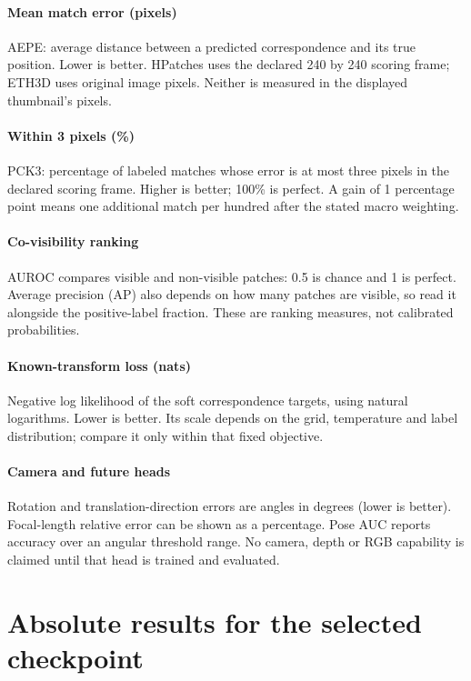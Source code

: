 \documentclass[10pt]{article}
\begin{document}
\paragraph{Mean match error (pixels)} AEPE: average distance between a predicted correspondence and its true position. Lower is better. HPatches uses the declared 240 by 240 scoring frame; ETH3D uses original image pixels. Neither is measured in the displayed thumbnail's pixels.
\paragraph{Within 3 pixels (\%)} PCK3: percentage of labeled matches whose error is at most three pixels in the declared scoring frame. Higher is better; 100\% is perfect. A gain of 1 percentage point means one additional match per hundred after the stated macro weighting.
\paragraph{Co-visibility ranking} AUROC compares visible and non-visible patches: 0.5 is chance and 1 is perfect. Average precision (AP) also depends on how many patches are visible, so read it alongside the positive-label fraction. These are ranking measures, not calibrated probabilities.
\paragraph{Known-transform loss (nats)} Negative log likelihood of the soft correspondence targets, using natural logarithms. Lower is better. Its scale depends on the grid, temperature and label distribution; compare it only within that fixed objective.
\paragraph{Camera and future heads} Rotation and translation-direction errors are angles in degrees (lower is better). Focal-length relative error can be shown as a percentage. Pose AUC reports accuracy over an angular threshold range. No camera, depth or RGB capability is claimed until that head is trained and evaluated.
\section{Absolute results for the selected checkpoint}
\end{document}
